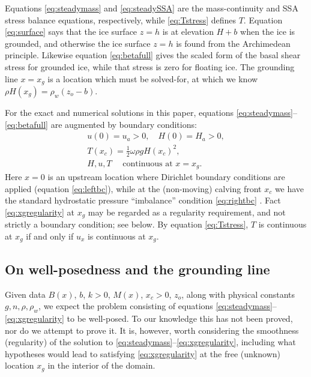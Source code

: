 \documentclass[review,letterpaper]{igs}
\begin{document}
Equations \eqref{eq:steadymass} and \eqref{eq:steadySSA} are the mass-continuity and SSA stress balance equations, respectively, while \eqref{eq:Tstress} defines $T$.  Equation \eqref{eq:surface} says that the ice surface $z=h$ is at elevation $H+b$ when the ice is grounded, and otherwise the ice surface $z=h$ is found from the Archimedean principle.  Likewise equation \eqref{eq:betafull} gives the scaled form of the basal shear stress for grounded ice, while that stress is zero for floating ice.  The grounding line $x=x_g$ is a location which must be solved-for, at which we know $\rho H(x_g) = \rho_w (z_o - b)$.

For the exact and numerical solutions in this paper, equations \eqref{eq:steadymass}--\eqref{eq:betafull} are augmented by boundary conditions:
\begin{gather}
u(0) = u_a > 0, \quad H(0) = H_a > 0, \label{eq:leftbc} \\
T(x_c) = \frac{1}{2} \omega \rho g H(x_c)^2,  \label{eq:rightbc} \\
H, u, T \quad \text{ continuous at } x = x_g.  \label{eq:xgregularity}
\end{gather}
Here $x=0$ is an upstream location where Dirichlet boundary conditions are applied (equation \eqref{eq:leftbc}), while at the (non-moving) calving front $x_c$ we have the standard hydrostatic pressure ``imbalance'' condition \eqref{eq:rightbc} \citep{SchoofMarine1}.  Fact \eqref{eq:xgregularity} at $x_g$ may be regarded as a regularity requirement, and not strictly a boundary condition; see below.  By equation \eqref{eq:Tstress}, $T$ is continuous at $x_g$ if and only if $u_x$ is continuous at $x_g$.

\subsection*{On well-posedness and the grounding line}  Given data $B(x)$, $b$, $k>0$, $M(x)$, $x_c>0$, $z_o$, along with physical constants $g,n,\rho,\rho_w$, we expect the problem consisting of equations \eqref{eq:steadymass}--\eqref{eq:xgregularity} to be well-posed.  To our knowledge this has not been proved, nor do we attempt to prove it.  It is, however, worth considering the smoothness (regularity) of the solution to \eqref{eq:steadymass}--\eqref{eq:xgregularity}, including what hypotheses would lead to satisfying \eqref{eq:xgregularity} at the free (unknown) location $x_g$ in the interior of the domain.
\end{document}
